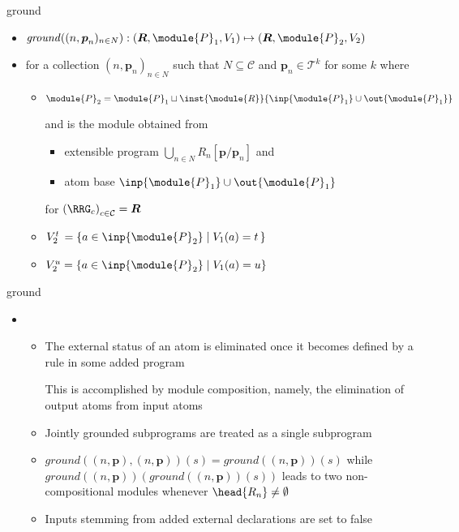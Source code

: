 \begin{frame}{ground}
  \begin{itemize}
  \item $\mathit{ground}((n,\boldsymbol{p}_n)_{n\in N}): ( \boldsymbol{R},\module{P}_1,V_1 )\mapsto(\boldsymbol{R},\module{P}_2,V_2 )$
    \smallskip
  \item []
    for a collection $(n,\boldsymbol{p}_n)_{n\in N}$ such that $N\subseteq\mathcal{C}$ and $\boldsymbol{p}_n\in\mathcal{T}^k$ for some $k$
    \pause[2]%
    \smallskip
    where
    \smallskip
    \begin{itemize}\normalsize
    \item $\module{P}_2=\module{P}_1\sqcup\inst{\module{R}}{\inp{\module{P}_1}\cup\out{\module{P}_1}}$
      \par\smallskip
      and
      is the module obtained from
      \begin{itemize}\normalsize
      \item extensible program
        \(
        \bigcup_{n\in N}R_n[\boldsymbol{p}/\boldsymbol{p}_n]
        \)
        and
      \item atom base $\inp{\module{P}_1}\cup\out{\module{P}_1}$
      \end{itemize}
      for $\left(\RRG_c\right)_{c\in\mathcal{C}}=\boldsymbol{R}$
      \smallskip
    \item   $V_2^t\,=\{a\in\inp{\module{P}_2}\mid V_1(a)=t\,\}$
    \item[] $V_2^u  =\{a\in\inp{\module{P}_2}\mid V_1(a)=u  \}$
    \end{itemize}
  \end{itemize}
\end{frame}
\begin{frame}{ground}
  \begin{itemize}
  \item {}
    \begin{itemize}\normalsize
    \item The external status of an atom is eliminated once it becomes defined by a rule in some added program
      \par
      This is accomplished by module composition, namely, the elimination of output atoms from input atoms
    \smallskip
    \item<2-> Jointly grounded subprograms are treated as a single subprogram
    \smallskip
    \item<3->  $\mathit{ground}((n,\boldsymbol{p}),(n,\boldsymbol{p}))(s)=\mathit{ground}((n,\boldsymbol{p}))(s)$ while
        $\mathit{ground}((n,\boldsymbol{p}))(\mathit{ground}((n,\boldsymbol{p}))(s))$
        leads to two non-compositional modules whenever $\head{R_n}\neq\emptyset$
    \smallskip
    \item<4-> Inputs stemming from added external declarations are set to false
    \end{itemize}
  \end{itemize}
\end{frame}
